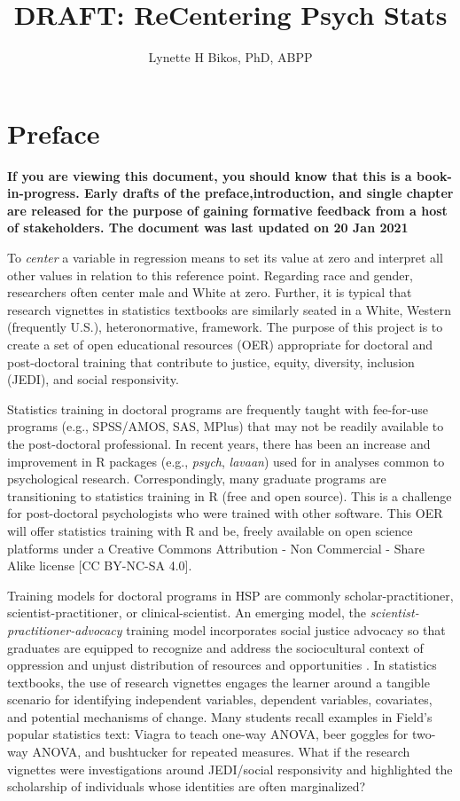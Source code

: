 \documentclass[
  english,
]{book}
\title{DRAFT: ReCentering Psych Stats}
\author{Lynette H Bikos, PhD, ABPP}
\date{}
\begin{document}
\maketitle

{
\setcounter{tocdepth}{1}
\tableofcontents
}
\hypertarget{preface}{%
\chapter*{Preface}\label{preface}}

\textbf{If you are viewing this document, you should know that this is a book-in-progress. Early drafts of the preface,introduction, and single chapter are released for the purpose of gaining formative feedback from a host of stakeholders. The document was last updated on 20 Jan 2021}

To \emph{center} a variable in regression means to set its value at zero and interpret all other values in relation to this reference point. Regarding race and gender, researchers often center male and White at zero. Further, it is typical that research vignettes in statistics textbooks are similarly seated in a White, Western (frequently U.S.), heteronormative, framework. The purpose of this project is to create a set of open educational resources (OER) appropriate for doctoral and post-doctoral training that contribute to justice, equity, diversity, inclusion (JEDI), and social responsivity.

Statistics training in doctoral programs are frequently taught with fee-for-use programs (e.g., SPSS/AMOS, SAS, MPlus) that may not be readily available to the post-doctoral professional. In recent years, there has been an increase and improvement in R packages (e.g., \emph{psych}, \emph{lavaan}) used for in analyses common to psychological research. Correspondingly, many graduate programs are transitioning to statistics training in R (free and open source). This is a challenge for post-doctoral psychologists who were trained with other software. This OER will offer statistics training with R and be, freely available on open science platforms under a Creative Commons Attribution - Non Commercial - Share Alike license {[}CC BY-NC-SA 4.0{]}.

Training models for doctoral programs in HSP are commonly scholar-practitioner, scientist-practitioner, or clinical-scientist. An emerging model, the \emph{scientist-practitioner-advocacy} training model incorporates social justice advocacy so that graduates are equipped to recognize and address the sociocultural context of oppression and unjust distribution of resources and opportunities \citep{mallinckrodt_scientist-practitioner-advocate_2014}. In statistics textbooks, the use of research vignettes engages the learner around a tangible scenario for identifying independent variables, dependent variables, covariates, and potential mechanisms of change. Many students recall examples in Field's \citeyearpar{field_discovering_2012} popular statistics text: Viagra to teach one-way ANOVA, beer goggles for two-way ANOVA, and bushtucker for repeated measures. What if the research vignettes were investigations around JEDI/social responsivity and highlighted the scholarship of individuals whose identities are often marginalized?
\end{document}
